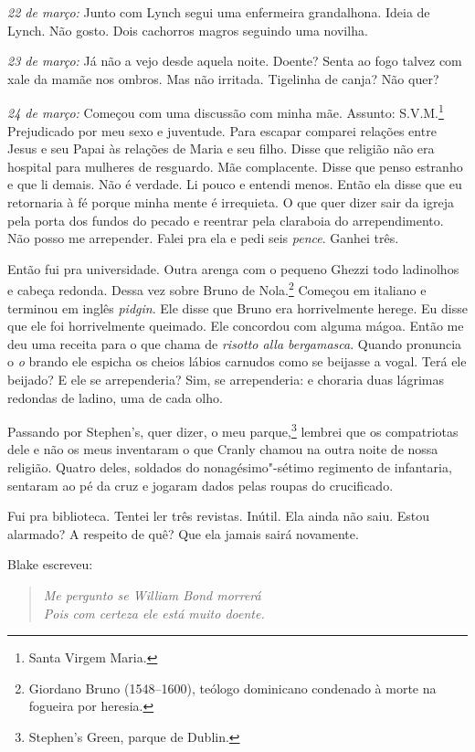 \medskip\noindent\textit{22 de março:} Junto com Lynch segui uma enfermeira grandalhona.
Ideia de Lynch. Não gosto. Dois cachorros magros seguindo uma novilha.

\medskip\noindent\textit{23 de março:} Já não a vejo desde aquela noite. Doente? Senta ao
fogo talvez com xale da mamãe nos ombros. Mas não irritada. Tigelinha
de canja? Não quer?

\medskip\noindent\textit{24 de março:} Começou com uma discussão com minha mãe. Assunto:
S.V.M.\footnote{ Santa Virgem Maria.} Prejudicado por meu sexo e
juventude. Para escapar comparei relações entre Jesus e seu Papai às
relações de Maria e seu filho. Disse que religião não era hospital para
mulheres de resguardo. Mãe complacente. Disse que penso estranho e que
li demais. Não é verdade. Li pouco e entendi menos. Então ela disse que
eu retornaria à fé porque minha mente é irrequieta. O que quer dizer
sair da igreja pela porta dos fundos do pecado e reentrar pela
claraboia do arrependimento. Não posso me arrepender. Falei pra ela e
pedi seis \textit{pence}. Ganhei três.

Então fui pra universidade. Outra arenga com o pequeno Ghezzi todo
ladinolhos e cabeça redonda. Dessa vez sobre Bruno de Nola.\footnote{
Giordano Bruno (1548--1600), teólogo dominicano condenado à morte na
fogueira por heresia.} Começou em italiano e terminou em inglês	           
\textit{pidgin}. Ele disse que Bruno era horrivelmente herege. Eu disse
que ele foi horrivelmente queimado. Ele concordou com alguma mágoa.
Então me deu uma receita para o que chama de \textit{risotto alla
bergamasca}. Quando pronuncia o \textit{o} brando ele espicha os cheios
lábios carnudos como se beijasse a vogal. Terá ele beijado? E ele se
arrependeria? Sim, se arrependeria: e choraria duas lágrimas redondas
de ladino, uma de cada olho.

Passando por Stephen’s, quer dizer, o meu
parque,\footnote{ Stephen’s Green, parque de Dublin.} lembrei que os
compatriotas dele e não os meus inventaram o que Cranly chamou na outra
noite de nossa religião. Quatro deles, soldados do nonagésimo"-sétimo
regimento de infantaria, sentaram ao pé da cruz e jogaram dados pelas
roupas do crucificado.

Fui pra biblioteca. Tentei ler três revistas. Inútil. Ela ainda não
saiu. Estou alarmado? A respeito de quê? Que ela jamais sairá novamente.

Blake escreveu:

\begin{verse}\itshape
Me pergunto se William Bond morrerá\\
Pois com certeza ele está muito doente.
\end{verse}

